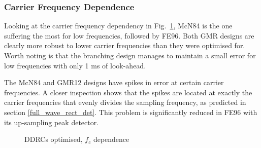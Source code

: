 \documentclass[../main2.tex]{subfiles}
\providecommand{\rootdir}{..}
\begin{document}
\subsubsection{Carrier Frequency Dependence}
Looking at the carrier frequency dependency in Fig.~\ref{fig:complete_DDRC_opt_fc_dep}, McN84 is the one suffering the most for low frequencies, followed by FE96. Both GMR designs are clearly more robust to lower carrier frequencies than they were optimised for. Worth noting is that the branching design manages to maintain a small error for low frequencies with only 1 ms of look-ahead. 

The McN84 and GMR12 designs have spikes in error at certain carrier frequencies. A closer inspection shows that the spikes are located at exactly the carrier frequencies that evenly divides the sampling frequency, as predicted in section \ref{full_wave_rect_det}. This problem is significantly reduced in FE96 with its up-sampling peak detector.

\begin{figure}[h]
\centerline{}
\caption{DDRCs optimised, $f_c$ dependence}
\label{fig:complete_DDRC_opt_fc_dep}
\end{figure}
\end{document}
